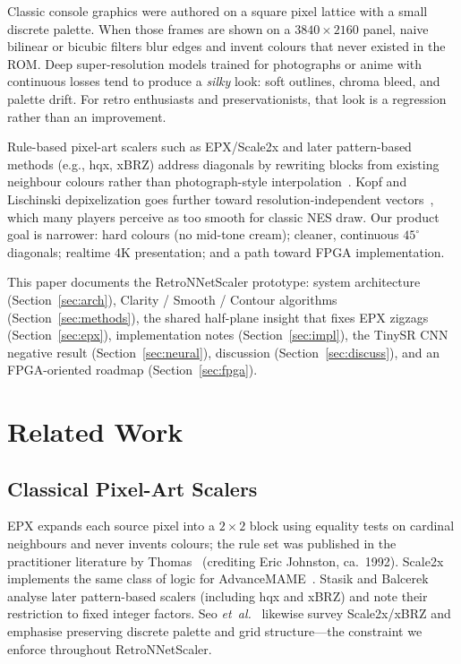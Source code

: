 \documentclass[conference]{IEEEtran}
\begin{document}
Classic console graphics were authored on a square pixel lattice with a small
discrete palette. When those frames are shown on a $3840{\times}2160$ panel,
naive bilinear or bicubic filters blur edges and invent colours that never
existed in the ROM. Deep super-resolution models trained for photographs or
anime with continuous losses tend to produce a \emph{silky} look: soft
outlines, chroma bleed, and palette drift. For retro enthusiasts and
preservationists, that look is a regression rather than an improvement.

Rule-based pixel-art scalers such as EPX/Scale2x and later pattern-based
methods (e.g., hqx, xBRZ) address diagonals by rewriting blocks from
existing neighbour colours rather than photograph-style
interpolation~\cite{thomas1999epx,mazzoleni2001scale2x,stasik2019pixel,seo2026structure}.
Kopf and Lischinski depixelization goes further toward
resolution-independent vectors~\cite{kopf2011}, which many players perceive
as too smooth for classic NES draw. Our product goal is narrower: hard
colours (no mid-tone cream); cleaner, continuous $45^\circ$ diagonals;
realtime 4K presentation; and a path toward FPGA implementation.

This paper documents the RetroNNetScaler prototype: system architecture
(Section~\ref{sec:arch}), Clarity / Smooth / Contour algorithms
(Section~\ref{sec:methods}), the shared half-plane insight that fixes EPX
zigzags (Section~\ref{sec:epx}), implementation notes
(Section~\ref{sec:impl}), the TinySR CNN negative result
(Section~\ref{sec:neural}), discussion (Section~\ref{sec:discuss}), and an
FPGA-oriented roadmap (Section~\ref{sec:fpga}).

\section{Related Work}
\label{sec:related}

\subsection{Classical Pixel-Art Scalers}
EPX expands each source pixel into a $2{\times}2$ block using equality tests
on cardinal neighbours and never invents colours; the rule set was published
in the practitioner literature by Thomas~\cite{thomas1999epx} (crediting
Eric Johnston, ca.\ 1992). Scale2x implements the same class of logic for
AdvanceMAME~\cite{mazzoleni2001scale2x}. Stasik and
Balcerek~\cite{stasik2019pixel} analyse later pattern-based scalers
(including hqx and xBRZ) and note their restriction to fixed integer factors.
Seo \emph{et~al.}~\cite{seo2026structure} likewise survey Scale2x/xBRZ and
emphasise preserving discrete palette and grid structure---the constraint we
enforce throughout RetroNNetScaler.
\end{document}
